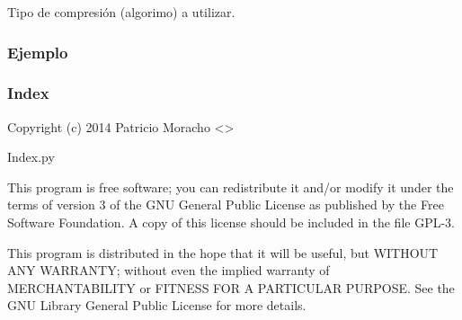 \documentclass[a4paper,12pt,spanish]{sphinxmanual}
\begin{document}
\begin{fulllineitems}

\begin{fulllineitems}
\label{\detokenize{openerm.Compressor:openerm.Compressor.Compressor.type}}
Tipo de compresión (algorimo) a utilizar.
\subsubsection*{Ejemplo}

\begin{sphinxVerbatim}[commandchars=\\\{\}]
   
  
\end{sphinxVerbatim}

\end{fulllineitems}


\end{fulllineitems}



\subsubsection{Index}
\label{\detokenize{openerm.Index:module-openerm.Index}}\label{\detokenize{openerm.Index:index}}\label{\detokenize{openerm.Index::doc}}
Copyright (c) 2014 Patricio Moracho \textless{}\textgreater{}

Index.py

This program is free software; you can redistribute it and/or
modify it under the terms of version 3 of the GNU General Public License
as published by the Free Software Foundation. A copy of this license should
be included in the file GPL-3.

This program is distributed in the hope that it will be useful,
but WITHOUT ANY WARRANTY; without even the implied warranty of
MERCHANTABILITY or FITNESS FOR A PARTICULAR PURPOSE.    See the
GNU Library General Public License for more details.
\end{document}
